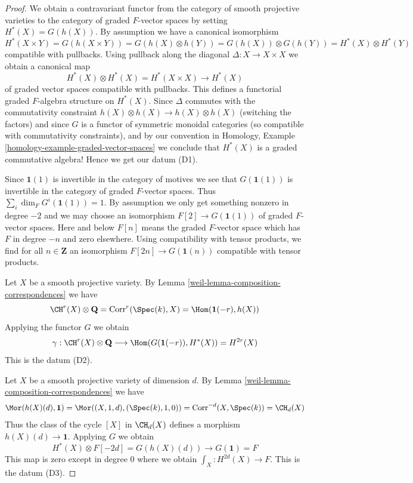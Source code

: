 \begin{proof}

We obtain a contravariant functor from the category of smooth
projective varieties to the category of graded $F$-vector spaces
by setting $H^*(X) = G(h(X))$. By assumption we have a canonical
isomorphism
$$
H^*(X \times Y) = G(h(X \times Y)) = G(h(X) \otimes h(Y)) =
G(h(X)) \otimes G(h(Y)) = H^*(X) \otimes H^*(Y)
$$
compatible with pullbacks. Using pullback along the diagonal
$\Delta : X \to X \times X$ we obtain a canonical map
$$
H^*(X) \otimes H^*(X) = H^*(X \times X) \to H^*(X)
$$
of graded vector spaces compatible with pullbacks.
This defines a functorial graded $F$-algebra structure on
$H^*(X)$. Since $\Delta$ commutes with the commutativity
constraint $h(X) \otimes h(X) \to h(X) \otimes h(X)$ (switching the factors)
and since $G$ is a functor of symmetric monoidal categories (so compatible with
commutativity constraints), and by our convention in
Homology, Example \ref{homology-example-graded-vector-spaces}
we conclude that $H^*(X)$ is a graded
commutative algebra! Hence we get our datum (D1).

\medskip\noindent
Since $\mathbf{1}(1)$ is invertible in the category of motives
we see that $G(\mathbf{1}(1))$ is invertible in the category of
graded $F$-vector spaces. Thus $\sum_i \dim_F G^i(\mathbf{1}(1)) = 1$.
By assumption we only get something nonzero in degree $-2$ and we may
choose an isomorphism $F[2] \to G(\mathbf{1}(1))$ of graded $F$-vector spaces.
Here and below $F[n]$ means the graded $F$-vector space which has
$F$ in degree $-n$ and zero elsewhere. Using compatibility with
tensor products, we find for all $n \in \mathbf{Z}$ an isomorphism
$F[2n] \to G(\mathbf{1}(n))$ compatible with tensor products.

\medskip\noindent
Let $X$ be a smooth projective variety. By
Lemma \ref{weil-lemma-composition-correspondences} we have
$$
\CH^r(X) \otimes \mathbf{Q} = \text{Corr}^r(\Spec(k), X) =
\Hom(\mathbf{1}(-r), h(X))
$$
Applying the functor $G$ we obtain
$$
\gamma :
\CH^r(X) \otimes \mathbf{Q} \longrightarrow
\Hom(G(\mathbf{1}(-r)), H^*(X)) = H^{2r}(X)
$$
This is the datum (D2).

\medskip\noindent
Let $X$ be a smooth projective variety of dimension $d$. By
Lemma \ref{weil-lemma-composition-correspondences} we have
$$
\Mor(h(X)(d), \mathbf{1}) = \Mor((X, 1, d), (\Spec(k), 1, 0)) =
\text{Corr}^{-d}(X, \Spec(k)) = \CH_d(X)
$$
Thus the class of the cycle $[X]$ in $\CH_d(X)$ defines a morphism
$h(X)(d) \to \mathbf{1}$. Applying $G$ we obtain
$$
H^*(X) \otimes F[-2d] = G(h(X)(d)) \longrightarrow G(\mathbf{1}) = F
$$
This map is zero except in degree $0$ where we obtain
$\int_X : H^{2d}(X) \to F$. This is the datum (D3).


\end{proof}
